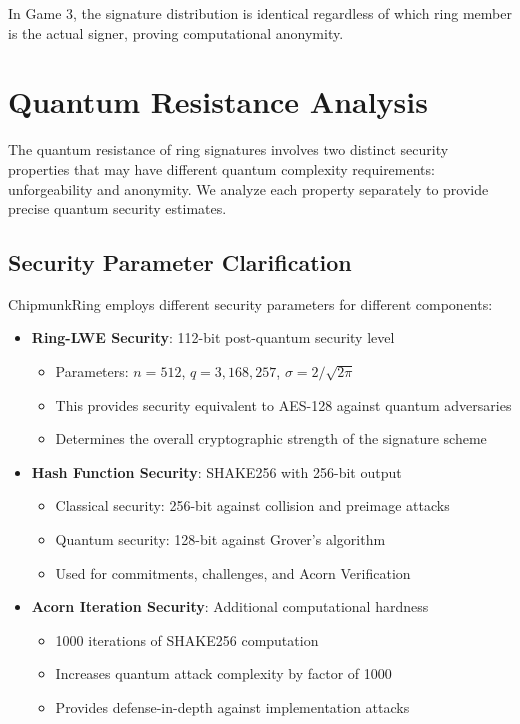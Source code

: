 \documentclass[11pt,a4paper]{article}
\begin{document}
In Game 3, the signature distribution is identical regardless of which ring member is the actual signer, proving computational anonymity.

\section{Quantum Resistance Analysis}

The quantum resistance of ring signatures involves two distinct security properties that may have different quantum complexity requirements: unforgeability and anonymity. We analyze each property separately to provide precise quantum security estimates.

\subsection{Security Parameter Clarification}

ChipmunkRing employs different security parameters for different components:

\begin{itemize}
\item \textbf{Ring-LWE Security}: 112-bit post-quantum security level
   \begin{itemize}
   \item Parameters: $n = 512$, $q = 3,168,257$, $\sigma = 2/\sqrt{2\pi}$
   \item This provides security equivalent to AES-128 against quantum adversaries
   \item Determines the overall cryptographic strength of the signature scheme
   \end{itemize}
   
\item \textbf{Hash Function Security}: SHAKE256 \cite{sha3-2015, bertoni2013} with 256-bit output
   \begin{itemize}
   \item Classical security: 256-bit against collision and preimage attacks
   \item Quantum security: 128-bit against Grover's algorithm \cite{grover1996}
   \item Used for commitments, challenges, and Acorn Verification
   \end{itemize}
   
\item \textbf{Acorn Iteration Security}: Additional computational hardness
   \begin{itemize}
   \item 1000 iterations of SHAKE256 computation
   \item Increases quantum attack complexity by factor of 1000
   \item Provides defense-in-depth against implementation attacks
   \end{itemize}
\end{itemize}
\end{document}
